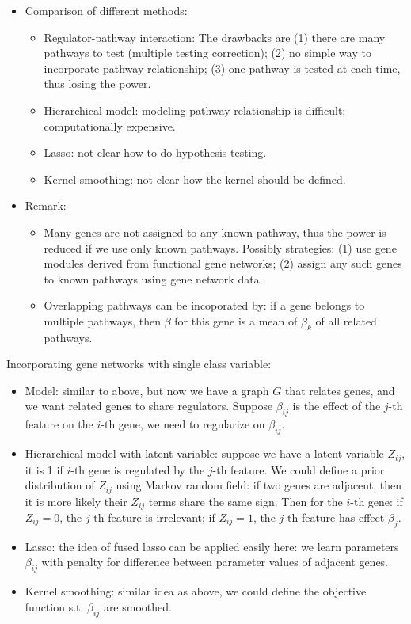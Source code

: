 \documentclass[11pt]{article}
\begin{document}
\begin{enumerate}
\begin{itemize}
\item Comparison of different methods: 
\begin{itemize}
	\item Regulator-pathway interaction: The drawbacks are (1) there are many pathways to test (multiple testing correction); (2) no simple way to incorporate pathway relationship; (3) one pathway is tested at each time, thus losing the power.  
	\item Hierarchical model: modeling pathway relationship is difficult; computationally expensive. 
	\item Lasso: not clear how to do hypothesis testing. 
	\item Kernel smoothing: not clear how the kernel should be defined. 
\end{itemize}

\item Remark: 
\begin{itemize}
	\item Many genes are not assigned to any known pathway, thus the power is reduced if we use only known pathways. Possibly strategies: (1) use gene modules derived from functional gene networks; (2) assign any such genes to known pathways using gene network data. 
	\item Overlapping pathways can be incoporated by: if a gene belongs to multiple pathways, then $\beta$ for this gene is a mean of $\beta_k$ of all related pathways.
\end{itemize}
\end{itemize}

Incorporating gene networks with single class variable: 
\begin{itemize}
\item Model: similar to above, but now we have a graph $G$ that relates genes, and we want related genes to share regulators. Suppose $\beta_{ij}$ is the effect of the $j$-th feature on the $i$-th gene, we need to regularize on $\beta_{ij}$. 

\item Hierarchical model with latent variable: suppose we have a latent variable $Z_{ij}$, it is 1 if $i$-th gene is regulated by the $j$-th feature. We could define a prior distribution of $Z_{ij}$ using Markov random field: if two genes are adjacent, then it is more likely their $Z_{ij}$ terms share the same sign. Then for the $i$-th gene: if $Z_{ij} = 0$, the $j$-th feature is irrelevant; if $Z_{ij} = 1$, the $j$-th feature has effect $\beta_j$. 

\item Lasso: the idea of fused lasso can be applied easily here: we learn parameters $\beta_{ij}$ with penalty for difference between parameter values of adjacent genes. 

\item Kernel smoothing: similar idea as above, we could define the objective function s.t. $\beta_{ij}$ are smoothed. 

\end{itemize}

\end{enumerate}
\end{document}
